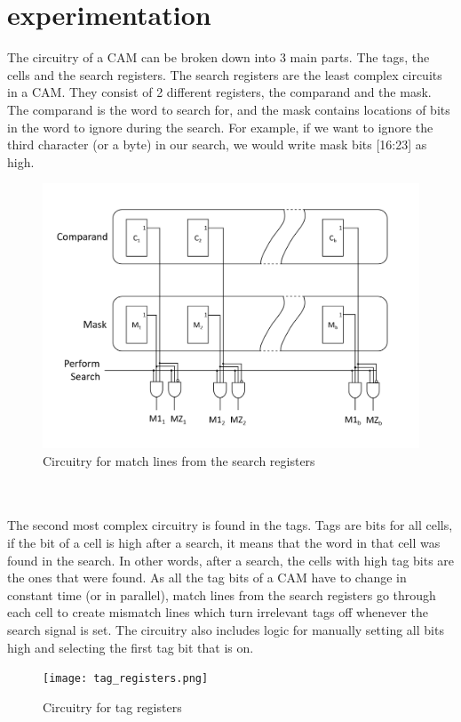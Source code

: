 \section{experimentation}
The circuitry of a CAM can be broken down into 3 main parts. The tags, the cells and the search registers. 
The search registers are the least complex circuits in a CAM. They consist of 2 different registers, the comparand and the mask. 
The comparand is the word to search for, and the mask contains locations of bits in the word to ignore during the search.
For example, if we want to ignore the third character (or a byte) in our search, we would write mask bits [16:23] as high.
\begin{figure}
    \includegraphics[width=1\columnwidth]{search_registers.png}
    \caption[Short text]{Circuitry for match lines from the search registers}
\end{figure}
\\\\
The second most complex circuitry is found in the tags.
Tags are bits for all cells, if the bit of a cell is high after a search, it means that the word in that cell was found in the search. 
In other words, after a search, the cells with high tag bits are the ones that were found. 
As all the tag bits of a CAM have to change in constant time (or in parallel), match lines from the search registers go through each cell to create mismatch lines which turn irrelevant tags off whenever the search signal is set.
The circuitry also includes logic for manually setting all bits high and selecting the first tag bit that is on.
\begin{figure}
    \texttt{[image: tag\_registers.png]}
    \caption[Short text]{Circuitry for tag registers}
\end{figure}
